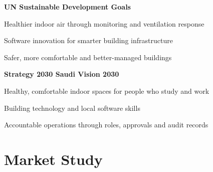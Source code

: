 \documentclass[11pt,a4paper]{article}
\begin{document}
\vspace{6pt}
\begingroup\leftskip=1.2cm
{\Large\bfseries\color{zteal} UN Sustainable Development Goals\par}
\vspace{12pt}
\newcommand{\sdg}[3]{{\color{znavy}\makebox[1.1cm][r]{\Large\bfseries #1}\hspace{8pt}{\large\bfseries #2}\par\vspace{3pt}\hspace*{1.4cm}#3\par\vspace{14pt}}}
\sdg{3}{Good Health and Well-being}{Healthier indoor air through \COtwo{} monitoring and ventilation response}
\sdg{9}{Industry, Innovation and Infrastructure}{Software innovation for smarter building infrastructure}
\sdg{11}{Sustainable Cities and Communities}{Safer, more comfortable and better-managed buildings}
\vspace{16pt}
{\Large\bfseries\color{zteal} Strategy 2030 \textperiodcentered{} Saudi Vision 2030\par}
\vspace{12pt}
\newcommand{\vision}[2]{{\color{znavy}\hspace*{1.4cm}{\large\bfseries #1}\par\vspace{3pt}\hspace*{1.4cm}#2\par\vspace{14pt}}}
\vision{A Vibrant Society}{Healthy, comfortable indoor spaces for people who study and work}
\vision{A Thriving Economy}{Building technology and local software skills}
\vision{An Ambitious Nation}{Accountable operations through roles, approvals and audit records}
\endgroup

\clearpage
\section{Market Study}
\end{document}
